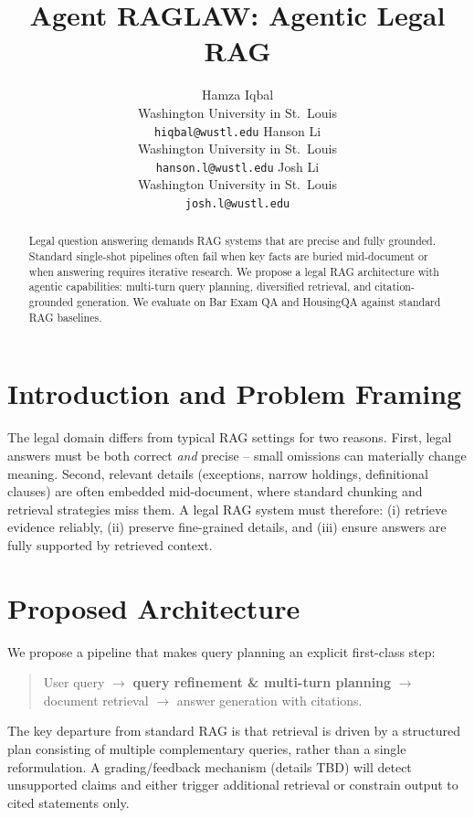 \documentclass{article}
\title{Agent RAGLAW: Agentic Legal RAG}
\author{%
  Hamza Iqbal \\
  Washington University in St.\ Louis \\
  \texttt{hiqbal@wustl.edu}
  \And
  Hanson Li \\
  Washington University in St.\ Louis \\
  \texttt{hanson.l@wustl.edu}
  \And
  Josh Li \\
  Washington University in St.\ Louis \\
  \texttt{josh.l@wustl.edu}
}
\begin{document}
\maketitle

\begin{abstract}
Legal question answering demands RAG systems that are precise and fully grounded. Standard single-shot pipelines often fail when key facts are buried mid-document or when answering requires iterative research. We propose a legal RAG architecture with agentic capabilities: multi-turn query planning, diversified retrieval, and citation-grounded generation. We evaluate on Bar Exam QA and HousingQA against standard RAG baselines.
\end{abstract}

\section{Introduction and Problem Framing}

The legal domain differs from typical RAG settings for two reasons. First, legal answers must be both correct \emph{and} precise -- small omissions can materially change meaning. Second, relevant details (exceptions, narrow holdings, definitional clauses) are often embedded mid-document, where standard chunking and retrieval strategies miss them. A legal RAG system must therefore: (i) retrieve evidence reliably, (ii) preserve fine-grained details, and (iii) ensure answers are fully supported by retrieved context.

\section{Proposed Architecture}

We propose a pipeline that makes query planning an explicit first-class step:

\begin{quote}
User query $\rightarrow$ \textbf{query refinement \& multi-turn planning} $\rightarrow$ document retrieval $\rightarrow$ answer generation with citations.
\end{quote}

The key departure from standard RAG is that retrieval is driven by a structured plan consisting of multiple complementary queries, rather than a single reformulation. A grading/feedback mechanism (details TBD) will detect unsupported claims and either trigger additional retrieval or constrain output to cited statements only.
\end{document}
